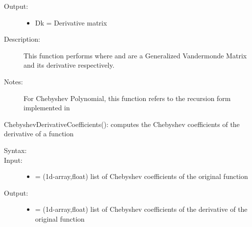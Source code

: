 \documentclass[letterpaper,10pt,english]{sphinxmanual}
\begin{document}
\begin{fulllineitems}
\begin{fulllineitems}
\begin{description}
\begin{itemize}
\end{itemize}

\item[{Output:}] \leavevmode\begin{itemize}
\item {} 
Dk = Derivative matrix

\end{itemize}

\item[{Description:}] \leavevmode
This function performs  where  and  are a Generalized Vandermonde Matrix and its derivative respectively.

\item[{Notes:}] \leavevmode
For Chebyshev Polynomial, this function refers to the recursion form implemented in 

\end{description}

\end{fulllineitems}


\begin{fulllineitems}
\label{index:SpectralToolbox.Spectral1D.Poly1D.ChebyshevDerivativeCoefficients}
ChebyshevDerivativeCoefficients(): computes the Chebyshev coefficients of the derivative of a function
\begin{description}
\item[{Syntax:}] \leavevmode
{}

\item[{Input:}] \leavevmode\begin{itemize}
\item {} 
 = (1d-array,float) list of Chebyshev coefficients of the original function

\end{itemize}

\item[{Output:}] \leavevmode\begin{itemize}
\item {} 
 = (1d-array,float) list of Chebyshev coefficients of the derivative of the original function

\end{itemize}


\end{description}
\end{fulllineitems}
\end{fulllineitems}
\end{document}

